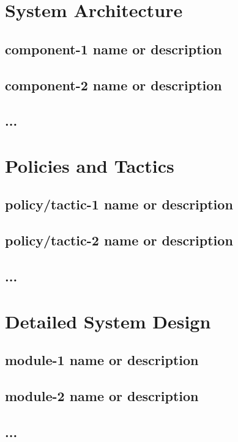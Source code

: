 \documentclass[conference]{IEEEtran}
\begin{document}
\section{System Architecture}

\subsection{component-1 name or description}

\subsection{component-2 name or description}

\subsection{...}


\section{Policies and Tactics}

\subsection{policy/tactic-1 name or description}

\subsection{policy/tactic-2 name or description}

\subsection{...}

\section{Detailed System Design}

\subsection{module-1 name or description}

\subsection{module-2 name or description}

\subsection{...}

\clearpage

\end{document}
